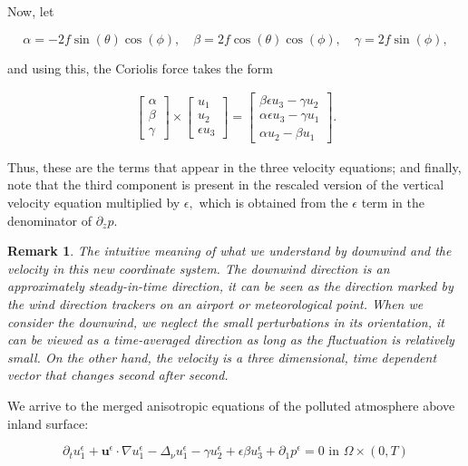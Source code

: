 \documentclass[11pt]{article}
\newtheorem{remark}{Remark}
\begin{document}
Now, let

$$\alpha = -2 f \sin(\theta)\cos(\phi), \quad \beta = 2 f \cos(\theta) \cos(\phi), \quad \gamma = 2 f \sin(\phi),$$

and using this, the Coriolis force takes the form

\begin{gather}
\begin{bmatrix} \alpha \\ \beta \\ \gamma \end{bmatrix}
 \times
 \begin{bmatrix} u_1 \\ u_2 \\ \epsilon u_3 \end{bmatrix}
 =
 \begin{bmatrix}  \beta \epsilon u_3 - \gamma u_2 \\ \alpha \epsilon u_3 - \gamma u_1 \\ \alpha u_2 - \beta u_1 \end{bmatrix}.
\end{gather}

Thus, these are the terms that appear in the three velocity equations; and finally, note that the third component is present in the rescaled version of the vertical velocity equation multiplied by $\epsilon,$ which is obtained from the $\epsilon$ term in the denominator of $\partial_z p.$

\begin{remark} \normalfont
The intuitive meaning of what we understand by downwind and the velocity in this new coordinate system. The downwind direction is an approximately steady-in-time direction, it can be seen as the direction marked by the wind direction trackers on an airport or meteorological point. When we consider the downwind, we neglect the small perturbations in its orientation, it can be viewed as a time-averaged direction as long as the fluctuation is relatively small. On the other hand, the velocity is a three dimensional, time dependent vector that changes second after second. 

\end{remark}
    
    We arrive to the merged anisotropic equations of the polluted atmosphere above inland surface:
  
    \begin{equation} \label{ANSC1}
    \partial_t u^\epsilon _1 + \mathbf{u}^\epsilon \cdot \nabla u^\epsilon _1 -\Delta_\nu u^\epsilon _1 -\gamma u_2^\epsilon + \epsilon \beta u_3^\epsilon + \partial_1 p^\epsilon = 0 \text{ in } \Omega \times (0,T)
    \end{equation}
    
\end{document}
